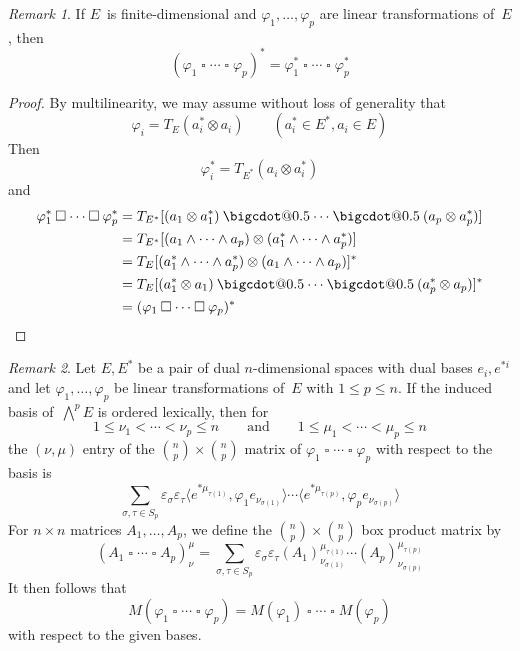 \documentclass[letterpaper,12pt]{article}
\makeatletter
\newcommand{\bigcdot}[1]{\mathbin{\mathpalette\bigcdot@{#1}}}
\newcommand{\bigcdot@}[2]{%
  \sbox0{$#1\vcenter{}$}%
  \sbox2{$#1\cdot\m@th$}%
  \hbox{%
    \hfil
    \raise\ht0\hbox{%
      \scalebox{#2}{%
        \lower\ht0\hbox{$#1\bullet\m@th$}%
      }%
    }%
    \hfil
  }%
}
\newcommand{\tprod}{\otimes}
\newcommand{\eprod}{\wedge}
\newcommand{\bigeprod}{\bigwedge}
\newcommand{\medeprod}{{\textstyle\bigeprod}}
\newcommand{\mprod}{\bigcdot{0.5}}
\newcommand{\bprod}{\mathbin{\square}}
\newcommand{\sprod}[2]{\langle#1,#2\rangle}
\newcommand{\multi}[4]{#2_{#3}#1\cdots#1#2_{#4}}
\newcommand{\eprods}[3]{\multi{\eprod}{#1}{#2}{#3}}
\newcommand{\bprods}[3]{\multi{\bprod}{#1}{#2}{#3}}
\newcommand{\sign}[1]{\varepsilon_{#1}}
\theoremstyle{definition}
\theoremstyle{remark}
\newtheorem*{rmk}{Remark}
\makeatother
\begin{document}
\begin{rmk}
If \(E\)~is finite-dimensional and \(\varphi_1,\ldots,\varphi_p\) are linear transformations of~\(E\), then
\[(\bprods{\varphi}{1}{p})^*=\bprods{\varphi^*}{1}{p}\]
\end{rmk}
\begin{proof}
By multilinearity, we may assume without loss of generality that
\[\varphi_i=T_E(a^*_i\tprod a_i)\qquad(a^*_i\in E^*,a_i\in E)\]
Then
\[\varphi_i^*=T_{E^*}(a_i\tprod a^*_i)\]
and
\begin{align*}
\bprods{\varphi^*}{1}{p}&=T_{E^*}[(a_1\tprod a^*_1)\mprod\cdots\mprod(a_p\tprod a^*_p)]\\
	&=T_{E^*}[(\eprods{a}{1}{p})\tprod(\eprods{a^*}{1}{p})]\\
	&=T_E[(\eprods{a^*}{1}{p})\tprod(\eprods{a}{1}{p})]^*\\
	&=T_E[(a^*_1\tprod a_1)\mprod\cdots\mprod(a^*_p\tprod a_p)]^*\\
	&=(\bprods{\varphi}{1}{p})^*\qedhere
\end{align*}
\end{proof}

\begin{rmk}
Let \(E,E^*\) be a pair of dual \(n\)-dimensional spaces with dual bases \(e_i,e^{*i}\) and let \(\varphi_1,\ldots,\varphi_p\) be linear transformations of~\(E\) with \(1\le p\le n\). If the induced basis of~\(\medeprod^p E\) is ordered lexically, then for
\[1\le\nu_1<\cdots<\nu_p\le n\qquad\text{and}\qquad 1\le\mu_1<\cdots<\mu_p\le n\]
the \((\nu,\mu)\) entry of the \(\binom{n}{p}\times\binom{n}{p}\) matrix of \(\bprods{\varphi}{1}{p}\) with respect to the basis is
\[\sum_{\sigma,\tau\in S_p}\sign{\sigma}\sign{\tau}\sprod{e^{*\mu_{\tau(1)}}}{\varphi_1e_{\nu_{\sigma(1)}}}\cdots\sprod{e^{*\mu_{\tau(p)}}}{\varphi_pe_{\nu_{\sigma(p)}}}\]
For \(n\times n\) matrices \(A_1,\ldots,A_p\), we define the \(\binom{n}{p}\times\binom{n}{p}\) box product matrix by
\[(\bprods{A}{1}{p})^{\mu}_{\nu}=\sum_{\sigma,\tau\in S_p}\sign{\sigma}\sign{\tau}(A_1)^{\mu_{\tau(1)}}_{\nu_{\sigma(1)}}\cdots(A_p)^{\mu_{\tau(p)}}_{\nu_{\sigma(p)}}\]
It then follows that
\[M(\bprods{\varphi}{1}{p})=M(\varphi_1)\bprod\cdots\bprod M(\varphi_p)\]
with respect to the given bases.
\end{rmk}
\end{document}
